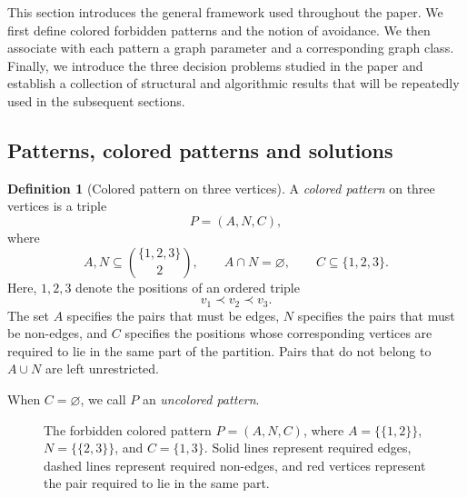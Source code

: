 \documentclass[12pt]{article}
\theoremstyle{plain}
\theoremstyle{definition}
\newtheorem{definition}[theorem]{Definition}
\theoremstyle{remark}
\theoremstyle{definition}
\begin{document}
This section introduces the general framework used throughout the paper.
We first define colored forbidden patterns and the notion of avoidance.
We then associate with each pattern a graph parameter and a
corresponding graph class. Finally, we introduce the three decision problems
studied in the paper and establish a collection of structural and algorithmic
results that will be repeatedly used in the subsequent sections.


\subsection{Patterns, colored patterns and solutions}
\label{subsec:patterns}
\begin{definition}[Colored pattern on three vertices]
A \emph{colored pattern} on three vertices is a triple
\[
P=(A,N,C),
\]
where
\[
A,N\subseteq \binom{\{1,2,3\}}{2},
\qquad
A\cap N=\varnothing,
\qquad
C\subseteq\{1,2,3\}.
\]
Here, \(1,2,3\) denote the positions of an ordered triple
\[
v_1\prec v_2\prec v_3.
\]
The set \(A\) specifies the pairs that must be edges, \(N\) specifies the pairs that must be non-edges, and
\(C\) specifies the positions whose corresponding vertices are required to lie in the same part of the partition.
Pairs that do not belong to \(A\cup N\) are left unrestricted.

When \(C=\varnothing\), we call \(P\) an \emph{uncolored pattern}.


\end{definition}



\begin{figure}[ht]
\centering
{}
\caption{The forbidden colored pattern \(P=(A,N,C)\), where \(A=\{\{1,2\}\}\), \(N=\{\{2,3\}\}\), and \(C=\{1,3\}\). Solid lines represent required edges, dashed lines represent required non-edges, and red vertices represent the pair required to lie in the same part.}
\label{fig:tiny-pattern}
\end{figure}
\end{document}
